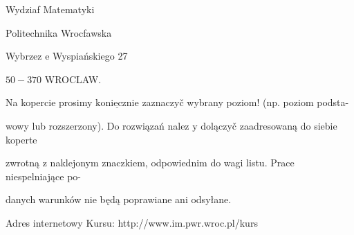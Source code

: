 \documentclass[a4paper,12pt]{article}
\begin{document}
Wydziaf Matematyki

Politechnika Wrocfawska

Wybrzez $\mathrm{e}$ Wyspiańskiego 27

$50-370$ WROCLAW.

Na kopercie prosimy $\underline{\mathrm{k}\mathrm{o}\mathrm{n}\mathrm{i}\mathrm{e}\mathrm{c}\mathrm{z}\mathrm{n}\mathrm{i}\mathrm{e}}$ zaznaczyč wybrany poziom! (np. poziom podsta-

wowy lub rozszerzony). Do rozwiązań nalez $\mathrm{y}$ dolączyč zaadresowaną do siebie koperte

zwrotną $\mathrm{z}$ naklejonym znaczkiem, odpowiednim do wagi listu. Prace niespelniające po-

danych warunków nie będą poprawiane ani odsyłane.

Adres internetowy Kursu: http://www.im.pwr.wroc.pl/kurs
\end{document}
